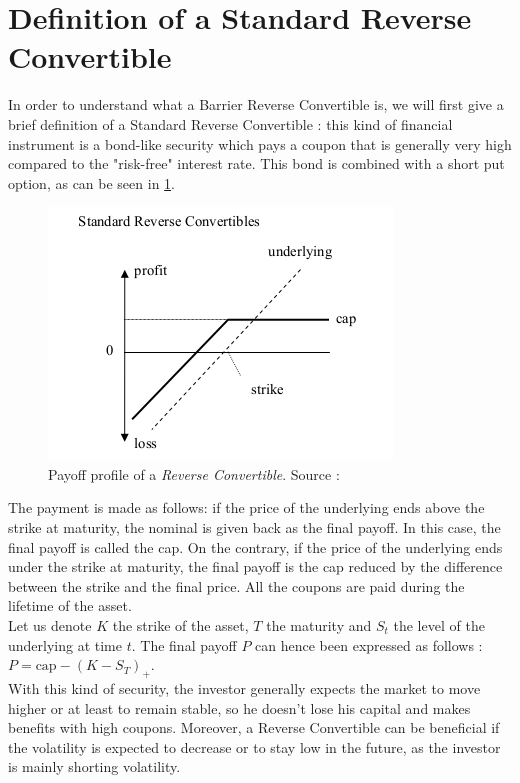 \documentclass[a4paper,11pt,english]{book}
\begin{document}
\section{Definition of a Standard Reverse Convertible}
In order to understand what a Barrier Reverse Convertible is, we will first give a brief definition of a Standard Reverse Convertible : this kind of financial instrument is a bond-like security which pays a coupon that is generally very high compared to the "risk-free" interest rate. This bond is combined with a short put option, as can be seen in \ref{fig:RC-payoff}.

\begin{figure}[!h]
    \centering
    \includegraphics[scale=0.7]{images/RC.png}
    \caption{Payoff profile of a \textit{Reverse Convertible}. Source : \cite{lindauer2008pricing}}
    \label{fig:RC-payoff}
\end{figure}

The payment is made as follows: if the price of the underlying ends above the strike at maturity, the nominal is given back as the final payoff. In this case, the final payoff is called the cap. On the contrary, if the price of the underlying ends under the strike at maturity, the final payoff is the cap reduced by the difference between the strike and the final price. All the coupons are paid during the lifetime of the asset.\\

Let us denote $K$ the strike of the asset, $T$ the maturity and $S_{t}$ the level of the underlying at time $t$. The final payoff $P$ can hence been expressed as follows :
$P=\text{cap}-(K-S_{T})_{+}$.\\

With this kind of security, the investor generally expects the market to move higher or at least to remain stable, so he doesn't lose his capital and makes benefits with high coupons. Moreover, a Reverse Convertible can be beneficial if the volatility is expected to decrease or to stay low in the future, as the investor is mainly shorting volatility.
\end{document}
